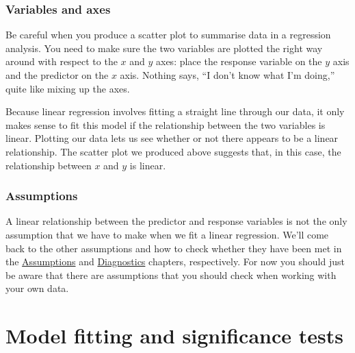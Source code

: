 \documentclass[
]{book}
\newenvironment{greybox}{
  \definecolor{shadecolor}{rgb}{0.95,0.95,0.95}  %
  \color{black}
  \begin{shaded}}
 {\end{shaded}}
\newenvironment{infobox}[1]
  {
  \begin{itemize}
  \renewcommand{\labelitemi}{
    \raisebox{-.7\height}[0pt][0pt]{
      {\setkeys{Gin}{width=3em,keepaspectratio}
        \texttt{[image: images/\#1]}}
    }
  }
  \setlength{\fboxsep}{1em}
  \begin{greybox}
  \item
  }
  {
  \end{greybox}
  \end{itemize}
  }
\begin{document}
\begin{infobox}{warning}

\hypertarget{variables-and-axes}{%
\subsubsection*{Variables and axes}\label{variables-and-axes}}

Be careful when you produce a scatter plot to summarise data in a regression analysis. You need to make sure the two variables are plotted the right way around with respect to the \(x\) and \(y\) axes: place the response variable on the \(y\) axis and the predictor on the \(x\) axis. Nothing says, ``I don't know what I'm doing,'' quite like mixing up the axes.

\end{infobox}

Because linear regression involves fitting a straight line through our data, it only makes sense to fit this model if the relationship between the two variables is linear. Plotting our data lets us see whether or not there appears to be a linear relationship. The scatter plot we produced above suggests that, in this case, the relationship between \(x\) and \(y\) is linear.

\begin{infobox}{warning}

\hypertarget{assumptions}{%
\subsubsection*{Assumptions}\label{assumptions}}

A linear relationship between the predictor and response variables is not the only assumption that we have to make when we fit a linear regression. We'll come back to the other assumptions and how to check whether they have been met in the \protect\hyperlink{assumptions-diagnostics}{Assumptions} and \protect\hyperlink{regression-diagnostics}{Diagnostics} chapters, respectively. For now you should just be aware that there are assumptions that you should check when working with your own data.

\end{infobox}

\hypertarget{model-fitting-and-significance-tests}{%
\section{Model fitting and significance tests}\label{model-fitting-and-significance-tests}}
\end{document}
